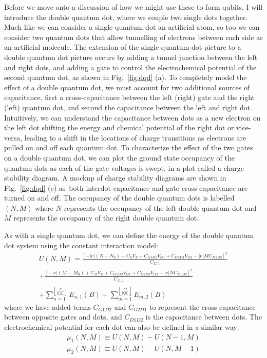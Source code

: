 Before we move onto a discussion of how we might use these to form qubits, I will introduce the double quantum dot,
where we couple two single dots together. Much like we can consider a single quantum dot an
artificial atom, so too we can consider two quantum dots that allow tunnelling of electrons between each side as
an artificial molecule. The extension of the single quantum dot picture to a double quantum dot picture occurs by
adding a tunnel junction between the left and right dots, and adding a gate to control the
electrochemical potential of the second quantum dot, as shown in Fig.~\ref{fig:dqd} (a).
To completely model the effect of a double quantum dot, we must account for two additional sources of capacitance, first
a cross-capacitance between the left (right) gate and the right (left) quantum dot, and second the capacitance between
the left and right dot. Intuitively, we can understand the capacitance between dots as a new electron on the left dot
shifting the energy and chemical potential of the right dot or vice-versa, leading to a shift in the locations of charge
transitions as electrons are pulled on and off each quantum dot. To characterize the effect of the two gates on a double
quantum dot, we can plot the ground state occupancy of the quantum dots as each of the gate voltages is swept, in a plot
called a charge stability diagram. A mockup of charge stability diagrams are shown in Fig.~\ref{fig:dqd} (c) as both interdot
capacitance and gate cross-capacitance are turned on and off. The occupancy of the double quantum dots is labelled
$(N, M)$ where $N$ represents the occupancy of the left double quantum dot and $M$ represents the occupancy of
the right double quantum dot.

As with a single quantum dot, we can define the energy of the double quantum dot system using the constant
interaction model:
\begin{multline}
  U(N, M) = \frac{[-|e|(N-N_{0}) + C_SV_S + C_{G1D1}V_{G1} + C_{G2D1}V_{G2} - |e|MC_{D1D2}]^2}{C_{\Sigma,1}} \\
          + \frac{[-|e|(M-M_{0}) + C_DV_D + C_{G1D2}V_{G1} + C_{G2D2}V_{G2} - |e|NC_{D1D2}]^2}{C_{\Sigma,2}} \\
          + \sum_{n=1}^{\left\lfloor\frac{N}{g_sg_v}\right\rfloor} E_{n,1}(B)
          + \sum_{m=1}^{\left\lfloor\frac{M}{g_sg_v}\right\rfloor} E_{m,2}(B)
\end{multline}
where we have added terms $C_{G1D2}$ and $C_{G2D1}$ to represent the cross capacitance between opposite
gates and dots, and $C_{D1D2}$ is the capacitance between dots. The electrochemical potential for each dot
can also be defined in a similar way:
\begin{align}
  \mu_1(N, M) \equiv U(N, M) - U(N-1, M) \\
  \mu_2(N, M) \equiv U(N, M) - U(N, M-1)
\end{align}

